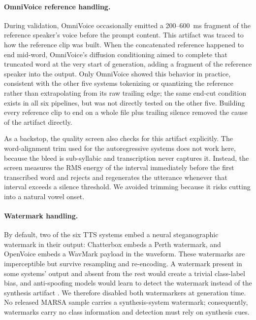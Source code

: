 \documentclass[11pt]{report}
\begin{document}
\paragraph{OmniVoice reference handling.} During validation, OmniVoice
occasionally emitted a 200--\SI{600}{\milli\second} fragment of the
reference speaker's voice before the prompt content. This artifact was
traced to how the reference clip was built. When the concatenated
reference happened to end mid-word, OmniVoice's diffusion conditioning
aimed to complete that truncated word at the very start of generation,
adding a fragment of the reference speaker into the output. Only
OmniVoice showed this behavior in practice, consistent with the other
five systems tokenizing or quantizing the reference rather than
extrapolating from its raw trailing edge; the same end-cut condition
exists in all six pipelines, but was not directly tested on the other
five. Building every reference clip to end on a whole file plus
trailing silence removed the cause of the artifact directly.

As a backstop, the quality screen also checks for this
artifact explicitly. The word-alignment trim used for the autoregressive
systems does not work here, because the bleed is sub-syllabic and
transcription never captures it. Instead, the screen measures the RMS
energy of the interval immediately before the first transcribed word and
rejects and regenerates the utterance whenever that interval exceeds a
silence threshold. We avoided trimming because it risks cutting into a
natural vowel onset.

\paragraph{Watermark handling.} By default, two of the
six TTS systems embed a neural steganographic watermark in their output:
Chatterbox embeds a Perth watermark, and OpenVoice embeds a WavMark
payload in the waveform. These watermarks are imperceptible but survive
resampling and re-encoding. A watermark present in some systems' output
and absent from the rest would create a trivial class-label bias, and
anti-spoofing models would learn to detect the watermark instead of the
synthesis artifact \citep{zhang2026impact}. We therefore disabled both watermarkers at generation
time. No released MARSA sample carries a synthesis-system watermark;
consequently, watermarks carry no class information and detection must rely on
synthesis cues.
\end{document}
